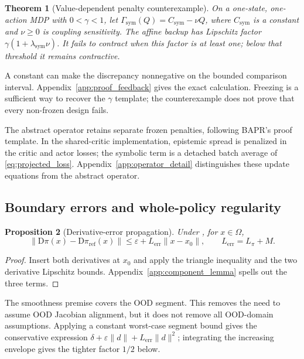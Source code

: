 \documentclass[10pt]{article}
\newtheorem{theorem}{Theorem}[section]
\newtheorem{proposition}[theorem]{Proposition}
\begin{document}
\begin{theorem}[Value-dependent penalty counterexample]
\label{thm:frozen_sym_necessary}
On a one-state, one-action MDP with $0<\gamma<1$, let
$\Gamma_{\mathrm{sym}}(Q)=C_{\mathrm{sym}}-\nu Q$,
where $C_{\mathrm{sym}}$ is a constant and $\nu\geq0$ is coupling sensitivity.
The affine backup has Lipschitz factor
$\gamma(1+\lambda_{\mathrm{sym}}\nu)$.
It fails to contract when this factor is at least one; below that threshold it remains contractive.
\end{theorem}
A constant can make the discrepancy nonnegative on the bounded comparison interval. Appendix~\ref{app:proof_feedback} gives the exact calculation. Freezing is a sufficient way to recover the $\gamma$ template; the counterexample does not prove that every non-frozen design fails.

The abstract operator retains separate frozen penalties, following BAPR's proof template. In the shared-critic implementation, epistemic spread is penalized in the critic and actor losses; the symbolic term is a detached batch average of \eqref{eq:projected_loss}. Appendix~\ref{app:operator_detail} distinguishes these update equations from the abstract operator.

\subsection{Boundary errors and whole-policy regularity}
\label{sec:composition}

\begin{proposition}[Derivative-error propagation]
\label{prop:composition}
Under , for $x\in\Omega$,
\begin{equation}
\|\mathrm{D}\pi(x)-\mathrm{D}\pi_{\mathrm{ref}}(x)\|
\leq\varepsilon+L_{\mathrm{err}}\|x-x_0\|,
\qquad L_{\mathrm{err}}=L_\pi+M.
\label{eq:deriv_error_propagation}
\end{equation}
\end{proposition}
\begin{proof}
Insert both derivatives at $x_0$ and apply the triangle inequality and the two derivative Lipschitz bounds. Appendix~\ref{app:component_lemma} spells out the three terms.
\end{proof}
The smoothness premise covers the OOD segment. This removes the need to assume OOD Jacobian alignment, but it does not remove all OOD-domain assumptions. Applying a constant worst-case segment bound gives the conservative expression
$\delta+\varepsilon\|d\|+L_{\mathrm{err}}\|d\|^2$;
integrating the increasing envelope gives the tighter factor $1/2$ below.
\end{document}
